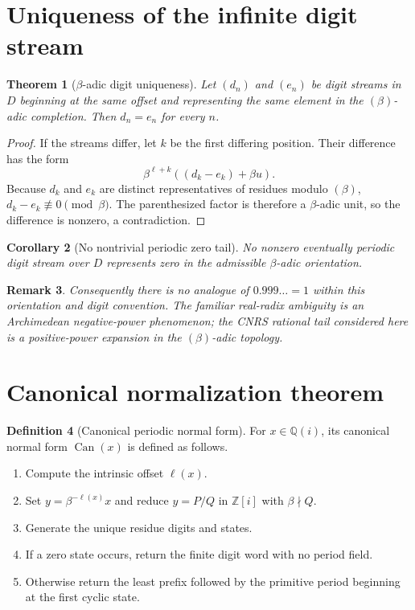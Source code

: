 \documentclass[11pt]{article}
\newtheorem{theorem}{Theorem}[section]
\newtheorem{corollary}[theorem]{Corollary}
\newtheorem{remark}[theorem]{Remark}
\theoremstyle{definition}
\newtheorem{definition}[theorem]{Definition}
\newcommand{\Zi}{\mathbb{Z}[i]}
\newcommand{\Qi}{\mathbb{Q}(i)}
\newcommand{\Can}{\operatorname{Can}}
\begin{document}
\section{Uniqueness of the infinite digit stream}

\begin{theorem}[$\beta$-adic digit uniqueness]
Let $(d_n)$ and $(e_n)$ be digit streams in $D$ beginning at the same offset and representing the same element in the $(\beta)$-adic completion.  Then $d_n=e_n$ for every $n$.
\end{theorem}

\begin{proof}
If the streams differ, let $k$ be the first differing position.  Their difference has the form
\[
\beta^{\ell+k}\left((d_k-e_k)+\beta u\right).
\]
Because $d_k$ and $e_k$ are distinct representatives of residues modulo $(\beta)$, $d_k-e_k\not\equiv0\pmod\beta$.  The parenthesized factor is therefore a $\beta$-adic unit, so the difference is nonzero, a contradiction.
\end{proof}

\begin{corollary}[No nontrivial periodic zero tail]
No nonzero eventually periodic digit stream over $D$ represents zero in the admissible $\beta$-adic orientation.
\end{corollary}

\begin{remark}
Consequently there is no analogue of $0.999\ldots=1$ within this orientation and digit convention.  The familiar real-radix ambiguity is an Archimedean negative-power phenomenon; the CNRS rational tail considered here is a positive-power expansion in the $(\beta)$-adic topology.
\end{remark}

\section{Canonical normalization theorem}

\begin{definition}[Canonical periodic normal form]
For $x\in\Qi$, its canonical normal form $\Can(x)$ is defined as follows.
\begin{enumerate}[label=(\roman*)]
\item Compute the intrinsic offset $\ell(x)$.
\item Set $y=\beta^{-\ell(x)}x$ and reduce $y=P/Q$ in $\Zi$ with $\beta\nmid Q$.
\item Generate the unique residue digits and states.
\item If a zero state occurs, return the finite digit word with no period field.
\item Otherwise return the least prefix followed by the primitive period beginning at the first cyclic state.
\end{enumerate}
\end{definition}
\end{document}
